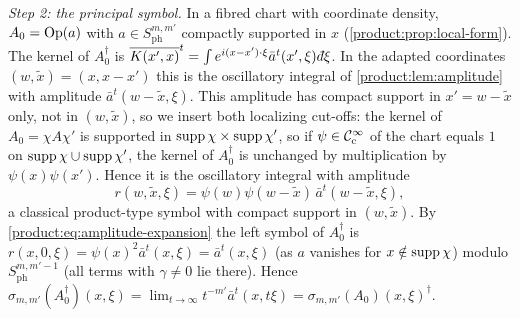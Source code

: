 \emph{Step 2: the principal symbol.} In a fibred chart with coordinate density,
$A_0=\operatorname{Op}(a)$ with $a\in S^{m,m'}_{\mathrm{ph}}$ compactly supported in $x$
(\cref{product:prop:local-form}). The kernel of $A_0^\dagger$ is
$\overline{K(x',x)}^t=\int e^{i(x-x')\cdot\xi}\bar a^t(x',\xi)\,\dbar\xi$. In the adapted
coordinates $(w,\tilde x)=(x,x-x')$ this is the oscillatory integral of
\cref{product:lem:amplitude} with amplitude $\bar a^t(w-\tilde x,\xi)$. This
amplitude has compact support in $x'=w-\tilde x$ only, not in $(w,\tilde x)$, so we
insert both localizing cut-offs: the kernel of $A_0=\chi A\chi'$ is supported in
$\operatorname{supp}\chi\times\operatorname{supp}\chi'$, so if $\psi\in\mathcal{C}^\infty_{\mathrm{c}}$ of the chart equals $1$ on
$\operatorname{supp}\chi\cup\operatorname{supp}\chi'$, the kernel of $A_0^\dagger$ is unchanged by
multiplication by $\psi(x)\psi(x')$. Hence it is the oscillatory integral with
amplitude
\begin{equation*}
r(w,\tilde x,\xi)=\psi(w)\psi(w-\tilde x)\,\bar a^t(w-\tilde x,\xi),
\end{equation*}
a classical product-type symbol with compact support in $(w,\tilde x)$. By
\eqref{product:eq:amplitude-expansion} the left symbol of $A_0^\dagger$ is
$r(x,0,\xi)=\psi(x)^2\bar a^t(x,\xi)=\bar a^t(x,\xi)$ (as $a$ vanishes for
$x\notin\operatorname{supp}\chi$) modulo $S^{m,m'-1}_{\mathrm{ph}}$ (all terms with $\gamma\ne0$
lie there). Hence $\sigma_{m,m'}(A_0^\dagger)(x,\xi)=\lim_{t\to\infty}t^{-m'}\bar
a^t(x,t\xi)=\sigma_{m,m'}(A_0)(x,\xi)^\dagger$.

